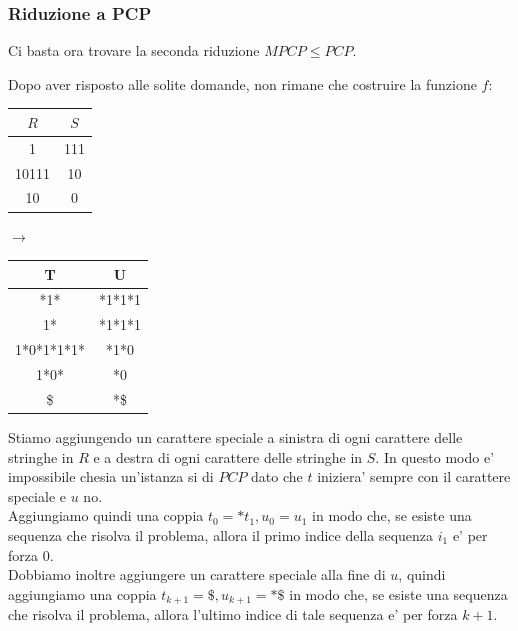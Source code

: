 \subsubsection{Riduzione a PCP}
Ci basta ora trovare la seconda riduzione $ MPCP \leq PCP $.

Dopo aver risposto alle solite domande, non rimane che costruire la funzione $ f $:
\begin{center}
  \begin{tabular}{c|c}
    $ R $ & $ S  $\\ \hline
    1 & 111\\
    10111 & 10\\
    10 & 0
  \end{tabular} $ \longrightarrow $
  \begin{tabular}{c|c}
    T & U\\ \hline
    *1* & *1*1*1\\ \hline
    1* & *1*1*1\\
    1*0*1*1*1* & *1*0\\
    1*0* & *0\\ \hline
    \$ & *\$
\end{tabular}
\end{center}

Stiamo aggiungendo un carattere speciale a sinistra di ogni carattere delle stringhe in $ R $ e a destra di ogni carattere delle stringhe in $ S  $. In questo modo e' impossibile chesia un'istanza si di $ PCP $ dato che $ t $ iniziera' sempre con il carattere speciale e $ u $ no.\\

Aggiungiamo quindi una coppia $ t_0 = *t_1 , u_0 = u_1 $ in modo che, se esiste una sequenza che risolva il problema, allora il primo indice della sequenza $ i_1 $ e' per forza 0.\\

Dobbiamo inoltre aggiungere un carattere speciale alla fine di $ u $, quindi aggiungiamo una coppia $ t_{k+1} = \$, u_{k+1} = *\$ $ in modo che, se esiste una sequenza che risolva il problema, allora l'ultimo indice di tale sequenza e' per forza $ k + 1 $.\\

